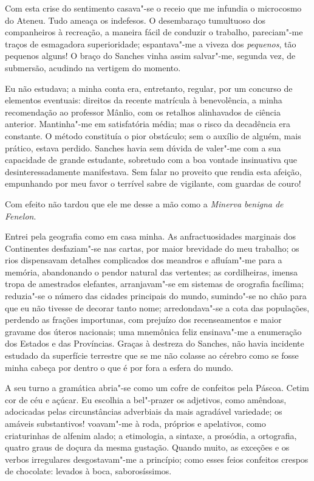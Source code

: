 Com esta crise do sentimento casava"-se o receio que me infundia o
microcosmo do Ateneu. Tudo ameaça os indefesos. O desembaraço
tumultuoso dos companheiros à recreação, a maneira fácil de conduzir o
trabalho, pareciam"-me traços de esmagadora superioridade;
espantava"-me a viveza dos \textit{pequenos}, tão pequenos alguns! O braço do
Sanches vinha assim salvar"-me, segunda vez, de submersão, acudindo na
vertigem do momento. 

Eu não estudava; a minha conta era, entretanto,
regular, por um concurso de elementos eventuais: direitos da recente
matrícula à benevolência, a minha recomendação ao professor Mânlio, com
os retalhos alinhavados de ciência anterior. Mantinha"-me em
satisfatória média; mas o risco da decadência era constante. O método
constituía o pior obstáculo; sem o auxílio de alguém, mais prático,
estava perdido. Sanches havia sem dúvida de valer"-me com a sua
capacidade de grande estudante, sobretudo com a boa vontade insinuativa
que desinteressadamente manifestava. Sem falar no proveito que rendia
esta afeição, empunhando por meu favor o terrível sabre de vigilante,
com guardas de couro! 

Com efeito não tardou que ele me desse a mão como
a \textit{Minerva benigna de Fenelon}. 

Entrei pela geografia como em casa minha.
As anfractuosidades marginais dos Continentes desfaziam"-se nas
cartas, por maior brevidade do meu trabalho; os rios dispensavam
detalhes complicados dos meandros e afluíam"-me para a memória,
abandonando o pendor natural das vertentes; as cordilheiras, imensa
tropa de amestrados elefantes, arranjavam"-se em sistemas de orografia
facílima; reduzia"-se o número das cidades principais do mundo,
sumindo"-se no chão para que eu não tivesse de decorar tanto nome;
arredondava"-se a cota das populações, perdendo as frações importunas,
com prejuízo dos recenseamentos e maior gravame dos úteros nacionais;
uma mnemônica feliz ensinava"-me a enumeração dos Estados e das
Províncias. Graças à destreza do Sanches, não havia incidente estudado
da superfície terrestre que se me não colasse ao cérebro como se fosse
minha cabeça por dentro o que é por fora a esfera do mundo. 

A seu turno a gramática abria"-se como um cofre de confeitos pela Páscoa. 
Cetim cor de céu e açúcar. Eu escolhia a bel"-prazer os adjetivos, como
amêndoas, adocicadas pelas circunstâncias adverbiais da mais agradável
variedade; os amáveis substantivos! voavam"-me à roda, próprios e
apelativos, como criaturinhas de alfenim alado; a etimologia, a
sintaxe, a prosódia, a ortografia, quatro graus de doçura da mesma
gustação. Quando muito, as exceções e os verbos irregulares
desgostavam"-me a princípio; como esses feios confeitos crespos de
chocolate: levados à boca, saborosíssimos. 

